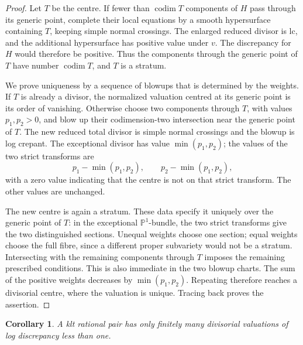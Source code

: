 \documentclass[11pt]{article}
\numberwithin{equation}{section}
\newtheorem{corollary}[theorem]{Corollary}
\theoremstyle{definition}
\newcommand{\Pj}{\mathbb P}
\begin{document}
\begin{proof}
Let $T$ be the centre. If fewer than $\operatorname{codim}T$ components
of $H$ pass through its generic point, complete their local equations
by a smooth hypersurface containing $T$, keeping simple normal
crossings. The enlarged reduced divisor is lc, and the additional
hypersurface has positive value under $v$. The discrepancy for $H$
would therefore be positive. Thus the components through the generic
point of $T$ have number $\operatorname{codim}T$, and $T$ is a stratum.

We prove uniqueness by a sequence of blowups that is determined by the
weights. If $T$ is already a divisor, the normalized valuation centred
at its generic point is its order of vanishing. Otherwise choose two
components through $T$, with values $p_1,p_2>0$, and blow up their
codimension-two intersection near the generic point of $T$. The new
reduced total divisor is simple normal crossings and the blowup is log
crepant. The exceptional divisor has value $\min(p_1,p_2)$; the values
of the two strict transforms are
\[
 p_1-\min(p_1,p_2),\qquad p_2-\min(p_1,p_2),
\]
with a zero value indicating that the centre is not on that strict
transform. The other values are unchanged.

The new centre is again a stratum. These data specify it uniquely over
the generic point of $T$: in the exceptional $\Pj^1$-bundle, the two
strict transforms give the two distinguished sections. Unequal weights
choose one section; equal weights choose the full fibre, since a
different proper subvariety would not be a stratum. Intersecting with
the remaining components through $T$ imposes the remaining prescribed
conditions. This is also immediate in the two blowup charts.
The sum of the positive weights decreases by $\min(p_1,p_2)$. Repeating
therefore reaches a divisorial centre, where the valuation is unique.
Tracing back proves the assertion.
\end{proof}

\begin{corollary}\label{cor:finite-low}
A klt rational pair has only finitely many divisorial valuations of log
discrepancy less than one.
\end{corollary}
\end{document}
